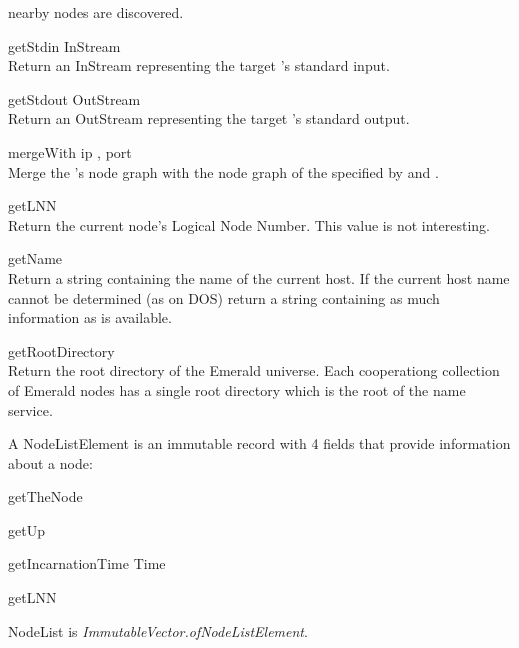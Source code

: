 \begin{desc}
    nearby nodes are discovered.
  \item[\kw{operation} getStdin \returns{} \/\LB{}InStream\/\RB{}]~\\
    Return an InStream representing the target 's standard input.
  \item[\kw{operation} getStdout \returns{} \/\LB{}OutStream\/\RB{}]~\\
    Return an OutStream representing the target 's standard output.
  \item[\kw{operation} mergeWith \/\LB{}ip \CO{} \tn{String}, port \CO{} \tn{Integer}\/\RB{}]~\\
    Merge the 's node graph with the node graph of the  specified
    by  and .
  \item[\kw{function} getLNN \returns{} \/\LB{}\tn{Integer}\/\RB{}]~\\
    Return the current node's Logical Node Number.  This value is not
    interesting.
  \item[\kw{function} getName \returns{} \/\LB{}\tn{String}\/\RB{}]~\\
    Return a string containing the name of the current host.  If the current
    host name cannot be determined (as on DOS) return a string containing as
    much information as is available.
  \item[\kw{function} getRootDirectory \returns{} \/\LB{}\tn{Directory}\/\RB{}]~\\
    Return the root directory of the Emerald universe.  Each cooperationg
    collection of Emerald nodes has a single root directory which is the
    root of the name service.
\end{desc}

\noindent A NodeListElement is an immutable record with 4 fields that
provide information about a node:

\begin{desc}
  \item[\kw{function} getTheNode \returns{} \/\LB{}\tn{Node}\/\RB{}]
  \item[\kw{function} getUp \returns{} \/\LB{}\tn{Boolean}\/\RB{}]
  \item[\kw{function} getIncarnationTime \returns{} \/\LB{}Time\/\RB{}]
  \item[\kw{function} getLNN \returns{} \/\LB{}\tn{Integer}\/\RB{}]
\end{desc}

\noindent NodeList is
{\it ImmutableVector.of\/\LB{}NodeListElement\/\RB{}}.

